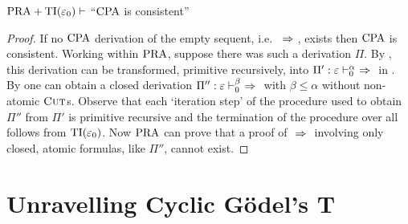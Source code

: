 \begin{corollary}
  $\mathrm{PRA} + \mathrm{TI}(\varepsilon_0) \vdash $ ``$\mathrm{CPA}$ is consistent''
\end{corollary}
\begin{proof}
  If no $\mathrm{CPA}$ derivation of the empty sequent, i.e.\ $~ \Rightarrow ~$, exists then
  $\mathrm{CPA}$ is consistent. Working within $\mathrm{PRA}$, suppose there was such a
  derivation $\Pi$. By , this derivation can be
  transformed, primitive recursively, into $\Pi' : \varepsilon \vdash^\alpha_0 ~
  \Rightarrow ~$ in . By  one can obtain a closed
  derivation $\Pi'' : \varepsilon \vdash^\beta_0 ~ \Rightarrow ~$ with $\beta \leq
  \alpha$ without non-atomic $\textsc{Cut}$s. Observe that each `iteration step' of the
  procedure used to obtain $\Pi''$ from $\Pi'$ is primitive recursive and the
  termination of the procedure over all follows from $\mathrm{TI}(\varepsilon_0)$. Now
  $\mathrm{PRA}$ can prove that a proof of $~ \Rightarrow ~$ involving only closed, atomic
  formulas, like $\Pi''$, cannot exist.
\end{proof}

\section{Unravelling Cyclic Gödel's T}
\label{sec:unrvl-gödel}











